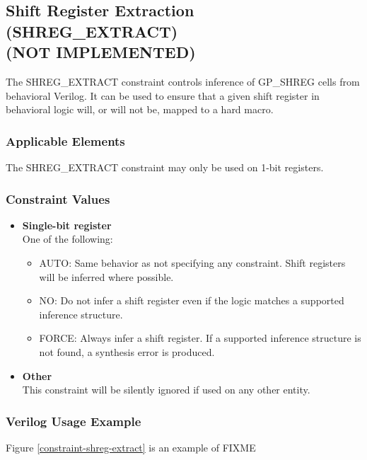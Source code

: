 \documentclass{article}
\begin{document}

\pagebreak
\subsection{Shift Register Extraction (SHREG\_EXTRACT) \\ (NOT IMPLEMENTED)}
\label{shreg-extract}

The SHREG\_EXTRACT constraint controls inference of GP\_SHREG cells from behavioral Verilog. It can be 
used to ensure that a given shift register in behavioral logic will, or will not be, mapped to a hard macro.

\subsubsection{Applicable Elements}
The SHREG\_EXTRACT constraint may only be used on 1-bit registers.

\subsubsection{Constraint Values}
\begin{itemize}
\item {\bfseries Single-bit register}\\
One of the following:
\begin{itemize}
\item AUTO: Same behavior as not specifying any constraint. Shift registers will be inferred where possible.
\item NO: Do not infer a shift register even if the logic matches a supported inference structure.
\item FORCE: Always infer a shift register. If a supported inference structure is not found, a synthesis error is produced.
\end{itemize}
\item {\bfseries Other} \\
This constraint will be silently ignored if used on any other entity.
\end{itemize}

\clearpage
\subsubsection{Verilog Usage Example}

Figure \ref{constraint-shreg-extract} is an example of FIXME
\end{document}
